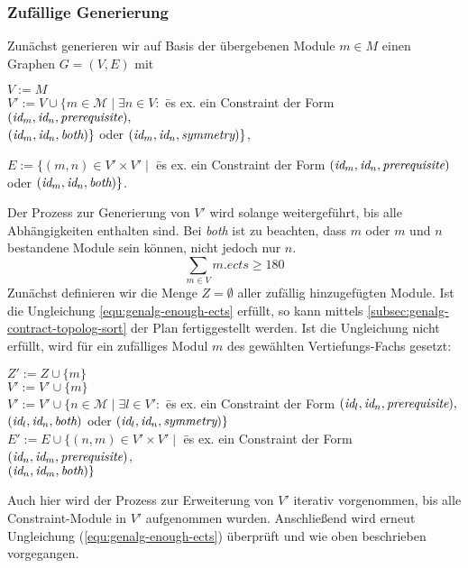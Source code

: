 \subsubsection{Zufällige Generierung}
\label{subsec:genalg-random-generation}
Zunächst generieren wir auf Basis der übergebenen Module $m \in M$ einen Graphen $G = (V, E)$ mit 
\begin{nstabbing}
	\quad $V := M$\\
	\quad $V' := V \cup \{m \in \mathcal{M} \mid \exists n \in V: $ \= es ex. ein Constraint der Form $ (\textit{id}_{m}, \textit{id}_{n}, \textit{prerequisite}), $ \\ 
	\> $ (\textit{id}_{m}, \textit{id}_{n}, \textit{both}) \} $ oder $ (\textit{id}_{m}, \textit{id}_{n}, \textit{symmetry}) \} $, 
\end{nstabbing}
\begin{nstabbing}
	\quad $E := \{ (m, n) \in V' \times V' \mid $ \= es ex. ein Constraint der Form $ (\textit{id}_{m}, \textit{id}_{n}, \textit{prerequisite}) $ \\
	\> oder $ (\textit{id}_{m}, \textit{id}_{n}, \textit{both})  \} $.
\end{nstabbing}
Der Prozess zur Generierung von $V'$ wird solange weitergeführt, bis alle Abhängigkeiten enthalten sind.
Bei \textit{both} ist zu beachten, dass $ m $ oder $ m $ und $ n $ bestandene Module sein können, nicht jedoch nur $ n $.
\begin{equation}
\sum_{m\in V}m.ects \geqslant 180
\label{equ:genalg-enough-ects}
\end{equation}
Zunächst definieren wir die Menge $Z=\emptyset$ aller zufällig hinzugefügten Module.
Ist die Ungleichung \ref{equ:genalg-enough-ects} erfüllt, so kann mittels \ref{subsec:genalg-contract-topolog-sort} der Plan fertiggestellt werden.
Ist die Ungleichung nicht erfüllt, wird für ein zufälliges Modul $m$ des gewählten Vertiefungs-Fachs gesetzt:
\begin{nstabbing} 
	\quad $Z' := Z \cup \{m\}$ \\
	\quad $V' := V' \cup \{m\}$ \\
	\quad $V' := V' \cup \{ n \in \mathcal{M} \mid \exists l \in V':$ \= es ex. ein Constraint der Form  $(\textit{id}_{l}, \textit{id}_{n}, \textit{prerequisite}), $ \\
	\>  $(\textit{id}_{l}, \textit{id}_{n}, \textit{both})$  oder $(\textit{id}_{l}, \textit{id}_{n}, \textit{symmetry}) \}$  \\
	\quad $E' := E \cup \{ (n, m) \in V' \times V' \mid$ \= es ex. ein Constraint der Form $(\textit{id}_{n}, \textit{id}_{m}, \textit{prerequisite})$,\\
	\> $(\textit{id}_{n}, \textit{id}_{m}, \textit{both})  \}$
\end{nstabbing}
Auch hier wird der Prozess zur Erweiterung von $V'$ iterativ vorgenommen, bis alle Constraint-Module in $V'$ aufgenommen wurden.
Anschließend wird erneut Ungleichung (\ref{equ:genalg-enough-ects}) überprüft und wie oben beschrieben vorgegangen.

